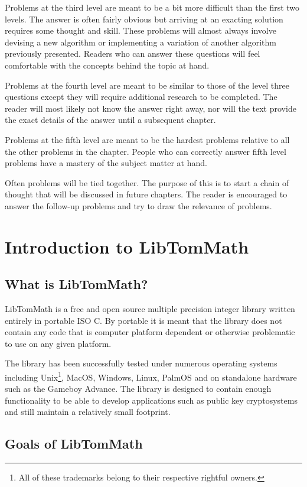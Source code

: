 \documentclass[b5paper]{book}
\begin{document}
Problems at the third level are meant to be a bit more difficult than the first two levels.  The answer is often 
fairly obvious but arriving at an exacting solution requires some thought and skill.  These problems will almost always 
involve devising a new algorithm or implementing a variation of another algorithm previously presented.  Readers who can
answer these questions will feel comfortable with the concepts behind the topic at hand.

Problems at the fourth level are meant to be similar to those of the level three questions except they will require 
additional research to be completed.  The reader will most likely not know the answer right away, nor will the text provide 
the exact details of the answer until a subsequent chapter.  

Problems at the fifth level are meant to be the hardest 
problems relative to all the other problems in the chapter.  People who can correctly answer fifth level problems have a 
mastery of the subject matter at hand.

Often problems will be tied together.  The purpose of this is to start a chain of thought that will be discussed in future chapters.  The reader
is encouraged to answer the follow-up problems and try to draw the relevance of problems.

\section{Introduction to LibTomMath}

\subsection{What is LibTomMath?}
LibTomMath is a free and open source multiple precision integer library written entirely in portable ISO C.  By portable it 
is meant that the library does not contain any code that is computer platform dependent or otherwise problematic to use on 
any given platform.  

The library has been successfully tested under numerous operating systems including Unix\footnote{All of these
trademarks belong to their respective rightful owners.}, MacOS, Windows, Linux, PalmOS and on standalone hardware such 
as the Gameboy Advance.  The library is designed to contain enough functionality to be able to develop applications such 
as public key cryptosystems and still maintain a relatively small footprint.

\subsection{Goals of LibTomMath}
\end{document}
